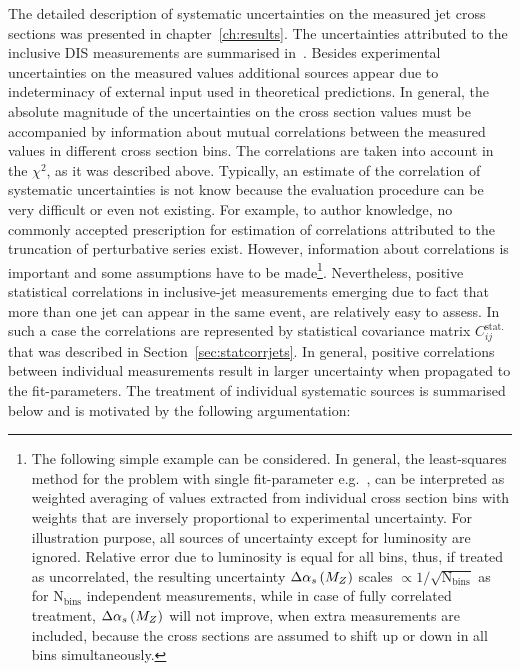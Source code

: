 The detailed description of systematic uncertainties on the measured jet cross sections was presented in chapter~\ref{ch:results}. The uncertainties attributed to the inclusive DIS measurements are summarised in~\cite{Aaron:2009aa}. Besides experimental uncertainties on the measured values additional sources appear due to indeterminacy of external input used in theoretical predictions. In general, the absolute magnitude of the uncertainties on the cross section values must be accompanied by information about mutual correlations between the measured values in different cross section bins. The correlations are taken into account in the $\chi^2$, as it was described above. Typically, an estimate of the correlation of systematic uncertainties is not know because the evaluation procedure can be very difficult or even not existing. For example, to author knowledge, no commonly accepted prescription for estimation of correlations attributed to the truncation of perturbative series exist. However, information about correlations is important and some assumptions have to be made\footnote{The following simple example can be considered. In general, the least-squares method for the problem with single fit-parameter e.g.~\asz, can be interpreted as weighted averaging of \asz values extracted from individual cross section bins with weights that are inversely proportional to experimental uncertainty. For illustration purpose, all sources of uncertainty except for luminosity are ignored. Relative error due to luminosity is equal for all bins, thus, if treated as uncorrelated, the resulting uncertainty $\Delta\mbox{$\alpha_{s}\left(M_{Z}\right)$}$ scales $\propto 1/\sqrt{\text{N}_\text{bins}}$ as for $\text{N}_\text{bins}$ independent \asz measurements, while in case of fully correlated treatment, $\Delta\mbox{$\alpha_{s}\left(M_{Z}\right)$}$ will not improve, when extra measurements are included, because the cross sections are assumed to shift up or down in all bins simultaneously.}. Nevertheless, positive statistical correlations in inclusive-jet measurements emerging due to fact that more than one jet can appear in the same event, are relatively easy to assess. In such a case the correlations are represented by statistical covariance matrix $C_{ij}^{\text{stat.}}$ that was described in Section~\ref{sec:statcorrjets}. In general, positive correlations between individual measurements result in larger uncertainty when propagated to the fit-parameters. The treatment of individual systematic sources is summarised below and is motivated by the following argumentation: 
